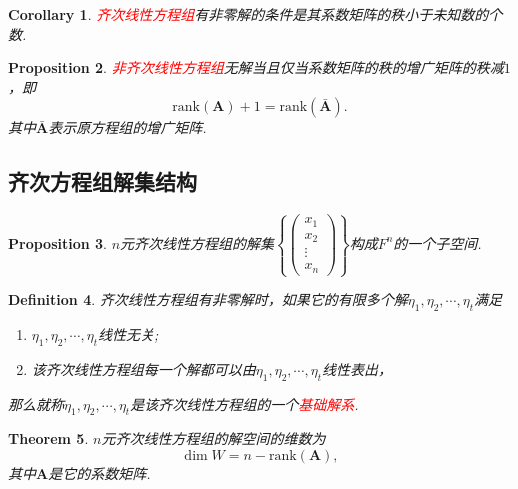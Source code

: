 \documentclass{article}
\newtheorem{theorem}{Theorem}[section]
\newtheorem{corollary}[theorem]{Corollary}
\newtheorem{proposition}[theorem]{Proposition}
\newtheorem{definition}[theorem]{Definition}
\newcommand{\mbf}[1]{\bm{#1}}
\newcommand{\rank}[1]{\text{rank}\left(#1\right)} %
\newcommand{\redt}[1]{\textcolor{red}{#1}}
\begin{document}
\begin{corollary}
\rm \redt{齐次线性方程组}有非零解的条件是其系数矩阵的秩小于未知数的个数.
\end{corollary}


\begin{proposition}
\rm \redt{非齐次线性方程组}无解当且仅当系数矩阵的秩的增广矩阵的秩减$1$，即
$$
\rank{\mbf{A}} + 1 = \rank{\bar{\mbf{A}}}.
$$ 
其中$\bar{\mbf{A}}$表示原方程组的增广矩阵. 
\end{proposition}

\subsection{齐次方程组解集结构}

\begin{proposition}
\rm $n$元齐次线性方程组的解集$\left\{\begin{pmatrix}
x_1\\
x_2\\
\vdots \\
x_n
\end{pmatrix}\right\}$构成$F^n$的一个子空间.
\end{proposition}

\begin{definition}
\rm 齐次线性方程组有非零解时，如果它的有限多个解$\eta_1,\eta_2,\cdots,\eta_t$满足
\begin{enumerate}
	\item $\eta_1,\eta_2,\cdots,\eta_t$线性无关;
	\item 该齐次线性方程组每一个解都可以由$\eta_1,\eta_2,\cdots,\eta_t$线性表出，
\end{enumerate}
那么就称$\eta_1,\eta_2,\cdots,\eta_t$是该齐次线性方程组的一个\redt{基础解系}.
\end{definition}

\begin{theorem}\label{homogeneous-linear-equation: the-dimension-of-sulotion-space}
\rm $n$元齐次线性方程组的解空间的维数为
$$
\dim W = n - \text{rank}(\mbf{A}),
$$
其中$\mbf{A}$是它的系数矩阵.
\end{theorem}
\end{document}
